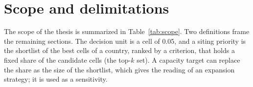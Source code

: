 \section{Scope and delimitations}
\label{sec:scope}

The scope of the thesis is summarized in Table~\ref{tab:scope}. Two definitions frame the remaining sections. The decision unit is a cell of 0.05\textdegree{}, and a siting priority is the shortlist of the best cells of a country, ranked by a criterion, that holds a fixed share of the candidate cells (the top-$k$ set). A capacity target can replace the share as the size of the shortlist, which gives the reading of an expansion strategy; it is used as a sensitivity.

